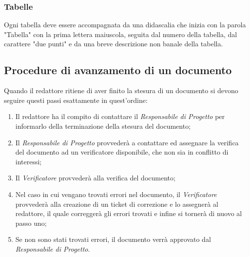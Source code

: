 \subsubsection{Tabelle}
Ogni tabella deve essere accompagnata da una didascalia che inizia con la parola "Tabella" con la prima lettera maiuscola, seguita dal numero della tabella, dal carattere "due punti" e da una breve descrizione non banale della tabella.

\subsection{Procedure di avanzamento di un documento}
Quando il redattore ritiene di aver finito la stesura di un documento si devono seguire questi passi esattamente in quest'ordine:
\begin{enumerate}
	\item Il redattore ha il compito di contattare il \textit{Responsabile di Progetto} per informarlo della terminazione della stesura del documento;
	\item Il \textit{Responsabile di Progetto} provvederà a contattare ed assegnare la verifica del documento ad un verificatore disponibile, che non sia in conflitto di interessi;
	\item Il \textit{Verificatore} provvederà alla  verifica del documento;
	\item Nel caso in cui vengano trovati errori nel documento, il \textit{Verificatore} provvederà alla creazione di un ticket di correzione e lo assegnerà al redattore, il quale correggerà gli errori trovati e infine si tornerà di nuovo al passo uno;
	\item Se non sono stati trovati errori, il documento verrà approvato dal \textit{Responsabile di Progetto}. 
\end{enumerate}
